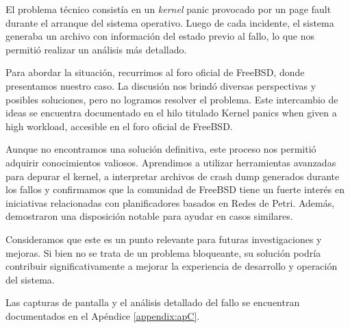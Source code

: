 El problema técnico consistía en un \textit{kernel} panic provocado por un page fault durante el arranque del sistema operativo. Luego de cada incidente, el sistema generaba un archivo con información del estado previo al fallo, lo que nos permitió realizar un análisis más detallado.\par

Para abordar la situación, recurrimos al foro oficial de FreeBSD, donde presentamos nuestro caso. La discusión nos brindó diversas perspectivas y posibles soluciones, pero no logramos resolver el problema. Este intercambio de ideas se encuentra documentado en el hilo titulado Kernel panics when given a high workload, accesible en el foro oficial de FreeBSD\cite{bib6}.\par

Aunque no encontramos una solución definitiva, este proceso nos permitió adquirir conocimientos valiosos. Aprendimos a utilizar herramientas avanzadas para depurar el kernel, a interpretar archivos de crash dump generados durante los fallos y confirmamos que la comunidad de FreeBSD tiene un fuerte interés en iniciativas relacionadas con planificadores basados en Redes de Petri. Además, demostraron una disposición notable para ayudar en casos similares.\par

Consideramos que este es un punto relevante para futuras investigaciones y mejoras. Si bien no se trata de un problema bloqueante, su solución podría contribuir significativamente a mejorar la experiencia de desarrollo y operación del sistema.\par

Las capturas de pantalla y el análisis detallado del fallo se encuentran documentados en el Apéndice \ref{appendix:apC}.\par
